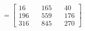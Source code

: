 \documentclass[preview]{standalone}
\begin{document}
\begin{align*}
=\begin{bmatrix} 16 & \quad 165 & \quad 40 \\ 196 & \quad 559 & \quad 176 \\ 316 & \quad 845 & \quad 270 \end{bmatrix}
\end{align*}
\end{document}

